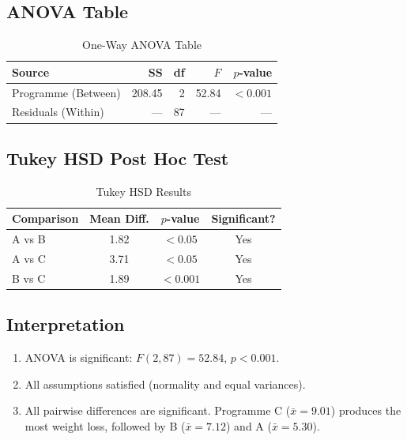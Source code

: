 \documentclass[12pt,a4paper]{article}
\begin{document}
\subsection{ANOVA Table}

\begin{table}[H]
  \centering
  \caption{One-Way ANOVA Table}
  \begin{tabular}{lrrrr}
    \toprule
    \textbf{Source} & \textbf{SS} & \textbf{df} & \textbf{$F$} & \textbf{$p$-value} \\
    \midrule
    Programme (Between) & 208.45 & 2  & 52.84 & $<0.001$ \\
    Residuals (Within)  & ---    & 87 & ---   & ---      \\
    \bottomrule
  \end{tabular}
\end{table}

\subsection{Tukey HSD Post Hoc Test}

\begin{table}[H]
  \centering
  \caption{Tukey HSD Results}
  \begin{tabular}{lccc}
    \toprule
    \textbf{Comparison} & \textbf{Mean Diff.} & \textbf{$p$-value} & \textbf{Significant?} \\
    \midrule
    A vs B & 1.82 & $<0.05$  & Yes \\
    A vs C & 3.71 & $<0.05$  & Yes \\
    B vs C & 1.89 & $<0.001$ & Yes \\
    \bottomrule
  \end{tabular}
\end{table}

\subsection{Interpretation}

\begin{enumerate}[leftmargin=*]
  \item ANOVA is significant: $F(2,87) = 52.84$, $p < 0.001$.
  \item All assumptions satisfied (normality and equal variances).
  \item All pairwise differences are significant. Programme C ($\bar{x} = 9.01$) produces the most weight loss, followed by B ($\bar{x} = 7.12$) and A ($\bar{x} = 5.30$).
\end{enumerate}
\end{document}
